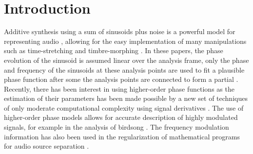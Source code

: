 \documentclass[twoside,a4paper]{article}
\title{\papertitle}
\newif\ifpdf
\begin{document}
\ifpdf %
  \DeclareGraphicsExtensions{.png,.jpg,.pdf}
\else  %
\fi

\maketitle

\begin{abstract}
    The accuracy of the Distribution Derivative Method (DDM)
    \cite{betser2009sinusoidal} is evaluated on mixtures of chirp signals. It is
    shown that accurate estimation can be obtained when the sets of atoms for
    which the inner product is large are disjoint.  This amounts to designing
    atoms with windows whose Fourier transform exhibits low sidelobes but which
    are once-differentiable in the time-domain. A technique for designing
    once-differentiable approximations to windows is presented and the accuracy
    of these windows in estimating the parameters of sinusoidal chirps in mixture is
    evaluated.
\end{abstract}


\section{Introduction}
\label{sec:intro}
Additive synthesis using a sum of sinusoids plus noise is a powerful model for
representing audio \cite{serra1989system}, allowing for the easy implementation
of many manipulations such as time-stretching \cite{marchand2004enhanced} and
timbre-morphing \cite{haken2007beyond}.
%
In these papers,
\cite{serra1989system,marchand2004enhanced,haken2007beyond} the
phase evolution of the sinusoid is assumed linear over the analysis frame, only
the phase and frequency of the sinusoids at these analysis points are used to
fit a plausible phase function after some the analysis points are connected to
form a partial \cite{mcaulay1986speech}. 
%
Recently, there has
been interest in using higher-order phase functions \cite{xuepiecewise} as the estimation of
their parameters has been made possible by a new set of techniques of only
moderate computational complexity using signal derivatives \cite{hamilton2012unified}.
%
The use
of higher-order phase models allows for accurate description of highly modulated
signals, for
example in the analysis of birdsong \cite{stowell2013improved}.
%
The frequency
modulation information has also been used in the
regularization of mathematical programs for audio source separation \cite{creager2016musicalsource}.
\end{document}
